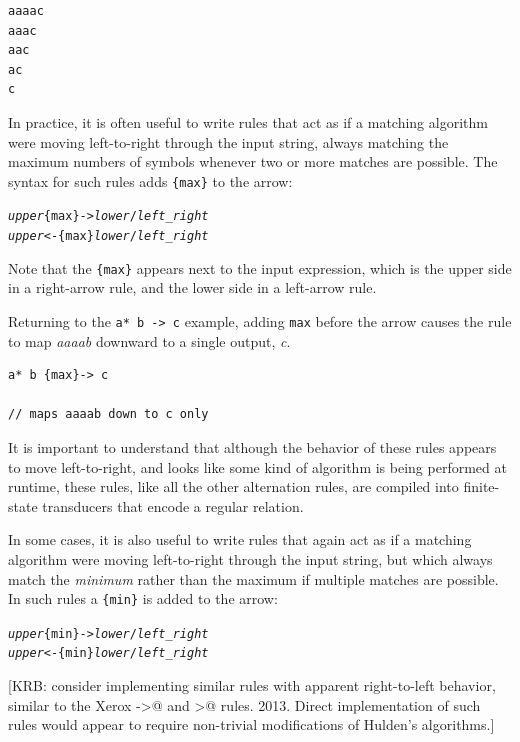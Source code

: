 \begin{Verbatim}
aaaac
aaac
aac
ac
c
\end{Verbatim}


In practice, it is often useful to write rules that act as
if a matching algorithm were moving left-to-right through the input string, always matching the
	maximum numbers of symbols whenever two or more matches are possible.  The syntax for such rules
	adds \verb!{max}! to the arrow:

\begin{alltt}
\emph{upper} \{max\}-> \emph{lower} / \emph{left} _ \emph{right}
\emph{upper} <-\{max\} \emph{lower} / \emph{left} _ \emph{right}
\end{alltt}

\noindent
Note that the \verb!{max}! appears next to the input expression, which is the upper side in a right-arrow rule, and the lower side
in a left-arrow rule.

Returning to the \verb!a* b -> c! example, adding \verb!max! before the arrow causes the rule to map
\emph{aaaab} downward to a single output, \emph{c}.

\begin{Verbatim}
a* b {max}-> c

// maps aaaab down to c only
\end{Verbatim}

\noindent
It is important to understand that although the behavior of these rules appears to move
left-to-right, and looks like some kind of algorithm is being performed at runtime, these
rules, like all the other alternation rules, are compiled into finite-state transducers
that encode a regular relation.

In some cases, it is also useful to write rules that again act as if a matching algorithm
were moving left-to-right through the input string, but which always match the
\emph{minimum} rather than the maximum if multiple matches are possible.  In such rules a
\verb!{min}! is added to the arrow:

\begin{alltt}
\emph{upper} \{min\}-> \emph{lower} / \emph{left} _ \emph{right}
\emph{upper} <-\{min\} \emph{lower} / \emph{left} _ \emph{right}
\end{alltt}

[KRB:  consider implementing similar rules with apparent right-to-left
behavior, similar to the Xerox ->@ and >@ rules.  2013.  Direct
implementation of such rules would appear to require non-trivial modifications of
Hulden's algorithms.]

